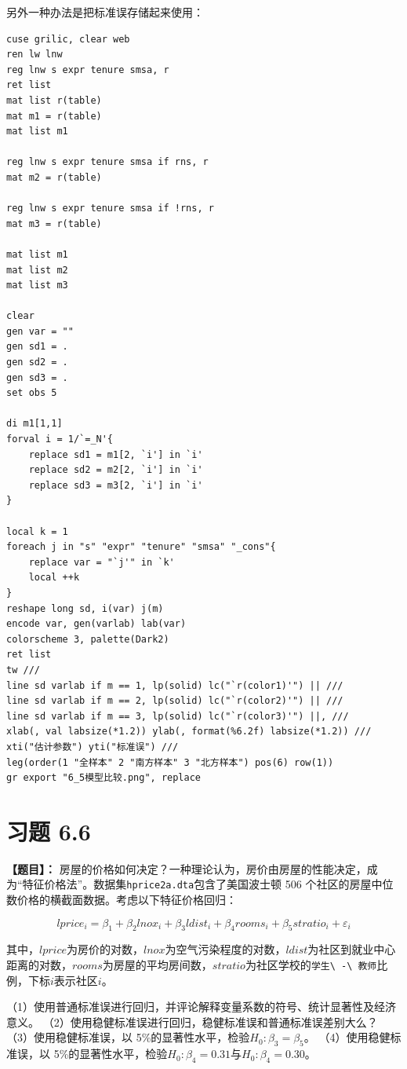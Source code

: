 \documentclass[cn,fancy,blue,11pt]{elegantbook}
\begin{document}
另外一种办法是把标准误存储起来使用：

\begin{lstlisting}
cuse grilic, clear web
ren lw lnw
reg lnw s expr tenure smsa, r
ret list
mat list r(table)
mat m1 = r(table)
mat list m1

reg lnw s expr tenure smsa if rns, r
mat m2 = r(table)

reg lnw s expr tenure smsa if !rns, r
mat m3 = r(table)

mat list m1
mat list m2
mat list m3

clear
gen var = ""
gen sd1 = .
gen sd2 = .
gen sd3 = .
set obs 5

di m1[1,1]
forval i = 1/`=_N'{
    replace sd1 = m1[2, `i'] in `i'
    replace sd2 = m2[2, `i'] in `i'
    replace sd3 = m3[2, `i'] in `i'
}

local k = 1
foreach j in "s" "expr" "tenure" "smsa" "_cons"{
    replace var = "`j'" in `k'
    local ++k
}
reshape long sd, i(var) j(m)
encode var, gen(varlab) lab(var)
colorscheme 3, palette(Dark2)
ret list
tw ///
line sd varlab if m == 1, lp(solid) lc("`r(color1)'") || ///
line sd varlab if m == 2, lp(solid) lc("`r(color2)'") || ///
line sd varlab if m == 3, lp(solid) lc("`r(color3)'") ||, ///
xlab(, val labsize(*1.2)) ylab(, format(%6.2f) labsize(*1.2)) ///
xti("估计参数") yti("标准误") ///
leg(order(1 "全样本" 2 "南方样本" 3 "北方样本") pos(6) row(1))
gr export "6_5模型比较.png", replace
\end{lstlisting}

\hypertarget{section-45}{%
\section{习题 6.6}\label{section-45}}

\textbf{【题目】：}
房屋的价格如何决定？一种理论认为，房价由房屋的性能决定，成为``特征价格法''。数据集\lstinline{hprice2a.dta}包含了美国波士顿 506 个社区的房屋中位数价格的横截面数据。考虑以下特征价格回归：

\begin{equation}
  lprice_i = \beta_1 + \beta_2lnox_i + \beta_3ldist_i + \beta_4rooms_i + \beta_5stratio_i + \varepsilon_i
\end{equation}

其中，\(lprice\)为房价的对数，\(lnox\)为空气污染程度的对数，\(ldist\)为社区到就业中心距离的对数，\(rooms\)为房屋的平均房间数，\(stratio\)为社区学校的\lstinline{学生\ -\ 教师}比例，下标\(i\)表示社区\(i\)。

（1）使用普通标准误进行回归，并评论解释变量系数的符号、统计显著性及经济意义。
（2）使用稳健标准误进行回归，稳健标准误和普通标准误差别大么？
（3）使用稳健标准误，以 5\%的显著性水平，检验\(H_0: \beta_3 = \beta_5\)。
（4）使用稳健标准误，以 5\%的显著性水平，检验\(H_0: \beta_4 = 0.31\)与\(H_0: \beta_4 = 0.30\)。
\end{document}
